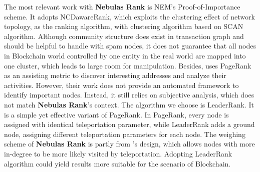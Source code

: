 The most relevant work with \textbf{Nebulas Rank} is NEM\cite{nem}'s Proof-of-Importance scheme. It adopts NCDawareRank\cite{Nikolakopoulos2013}, which exploits the clustering effect of network topology, as the ranking algorithm, with clustering algorithm based on SCAN algorithm\cite{xu2007scan}\cite{shiokawa2015scan}\cite{chang2017mathsf}. Although community structure does exist in transaction graph and should be helpful to handle with spam nodes, it does not guarantee that all nodes in Blockchain world controlled by one entity in the real world are mapped into one cluster, which leads to large room for manipulation. Besides, \textcite{Fleder2015} uses PageRank\cite{Brin2010}\cite{page1999pagerank} as an assisting metric to discover interesting addresses and analyze their activities. However, their work does not provide an automated framework to identify important nodes. Instead, it still relies on subjective analysis, which does not match \textbf{Nebulas Rank}'s context. The algorithm we choose is LeaderRank\cite{Chen2013}\cite{Li2014}. It is a simple yet effective variant of PageRank\cite{Brin2010}\cite{page1999pagerank}. In PageRank, every node is assigned with identical teleportation parameter, while LeaderRank adds a ground node, assigning different teleportation parameters for each node. The weighing scheme of \textbf{Nebulas Rank} is partly from \textcite{Li2014}'s design, which allows nodes with more in-degree to be more likely visited by teleportation. Adopting LeaderRank algorithm could yield results more suitable for the scenario of Blockchain.

